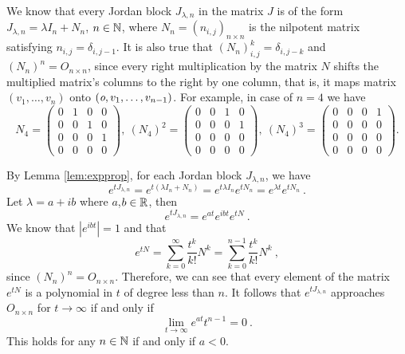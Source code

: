 We know that every Jordan block $J_{\lambda,n}$ in the matrix $J$ is of the form \linebreak $J_{\lambda,n}=\lambda I_n+N_n$, $n \in\mathbb{N}$, where $N_n=\left(n_{i,j}\right)_{n\times n}$ is the nilpotent matrix satisfying $n_{i,j}=\delta_{i,j-1}$. 
It is also true that $(N_n)^k_{i,j}=\delta_{i,j-k}$ and $(N_n)^n=O_{n \times n}$, since every right multiplication by the matrix $N$ shifts the multiplied matrix's columns to the right by one column, that is, it maps matrix $(v_1,\ldots,v_n)$ onto $(\textit{o},v_1,\ldots,v_{n-1})$. For example, in case of $n=4$ we have
\begin{equation*}
	N_4=
	\begin{pmatrix}
		0 & 1 & 0 & 0 \\
		0 & 0 & 1 & 0 \\
		0 & 0 & 0 & 1 \\
		0 & 0 & 0 & 0 
	\end{pmatrix},\ 
	(N_4)^2=
	\begin{pmatrix}
		0 & 0 & 1 & 0 \\
		0 & 0 & 0 & 1 \\
		0 & 0 & 0 & 0 \\
		0 & 0 & 0 & 0 
	\end{pmatrix},\ 
	(N_4)^3=
	\begin{pmatrix}
		0 & 0 & 0 & 1 \\
		0 & 0 & 0 & 0 \\
		0 & 0 & 0 & 0 \\
		0 & 0 & 0 & 0 
	\end{pmatrix}
	.
\end{equation*}

By Lemma \ref{lem:expprop}, for each Jordan block $J_{\lambda,n}$, we have
$$e^{tJ_{\lambda,n}}=e^{t(\lambda I_n + N_n)}=e^{t\lambda I_n}e^{tN_n}=e^{\lambda t}e^{tN_n}\ .$$
Let $\lambda = a+ib$ where $a$,$b \in \mathbb{R}$, then
$$e^{tJ_{\lambda,n}}=e^{at}e^{ibt}e^{tN}\ .$$
We know that $|e^{ibt}|=1$ and that
$$e^{tN}=\sum^\infty_{k=0}\frac{t^k}{k!}N^k=\sum^{n-1}_{k=0}\frac{t^k}{k!}N^k\ ,$$
since $(N_n)^n=O_{n \times n}$. Therefore, we can see that every element of the matrix $e^{tN}$ is a polynomial in $t$ of degree less than $n$. It follows that $e^{tJ_{\lambda,n}}$ approaches $O_{n \times n}$ for $t\rightarrow\infty$ if and only if
$$\lim_{t\to\infty}e^{at}t^{n-1}=0\ .$$
This holds for any $n\in\mathbb{N}$ if and only if $a<0$. 

